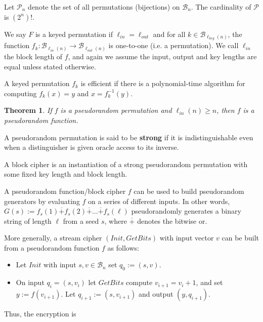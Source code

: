 \documentclass[a4paper, 12pt]{article}
\newtheorem{theorem}{Theorem}
\newtheorem{theorem}{Theorem}
\begin{document}
Let $\mathcal{P}_n$ denote the set of all permutations (bijections)
on $\mathcal{B}_n$. The cardinality of $\mathcal{P}$ is 
$( 2^n )!$.

We say $F$ is a keyed permutation if $\ell_{in} = \ell_{out}$ and 
for all $k \in \mathcal{B}_{\ell_{key}(n)}$, the function
$f_k : \mathcal{B}_{\ell_{in}(n)} \to  \mathcal{B}_{\ell_{out}(n)}$
is one-to-one (i.e. a permutation). We call 
$\ell_{in}$ the block length of $f$, and again we assume 
the input, output and key lengths are equal unless 
stated otherwise. 

A keyed permutation $f_k$ is efficient if there is a polynomial-time 
algorithm for computing $f_k(x) = y$ and $x = f^{-1}_k(y)$.

\begin{theorem}
    If $f$ is a pseudorandom permutation and $\ell_{in}(n) \geq n$,
    then $f$ is a pseudorandom function.
\end{theorem}

A pseudorandom permutation is said to be \textbf{strong} if 
it is indistinguishable even when a distinguisher is given 
oracle access to its inverse.

\begin{definition}
    A block cipher is an instantiation of a strong pseudorandom 
    permutation with some fixed key length and block length.
\end{definition}

A pseudorandom function/block cipher $f$ can be used to build 
pseudorandom generators by evaluating $f$ on a series of different 
inputs. In other words, $G(s) := f_s(1) \overline{+} f_s(2) \overline{+} \ldots \overline{+} f_s(\ell)$
pseudorandomly generates a binary string of length $\ell$
from a seed $s$, where $\overline{+}$ denotes the bitwise or.

More generally, a stream cipher $(Init, GetBits)$ with input vector
$v$ can be built from a pseudorandom function $f$ as follows:

\begin{itemize}
    \item Let $Init$ with input $s, v \in \mathcal{B}_n$ set $q_0 := (s, v)$.
    \item On input $q_i = (s, v_i)$ let $GetBits$ compute 
        $v_{i+1} = v_{i} + 1$, and set $y := f(v_{i+1})$. Let 
        $q_{i+1} := (s, v_{i+1})$ and output $(y, q_{i+1})$.
\end{itemize}

Thus, the encryption is
\end{document}
